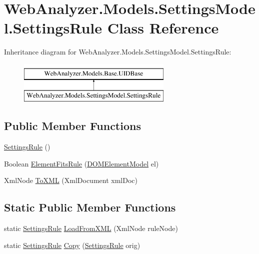 \hypertarget{class_web_analyzer_1_1_models_1_1_settings_model_1_1_settings_rule}{}\section{Web\+Analyzer.\+Models.\+Settings\+Model.\+Settings\+Rule Class Reference}
\label{class_web_analyzer_1_1_models_1_1_settings_model_1_1_settings_rule}
Inheritance diagram for Web\+Analyzer.\+Models.\+Settings\+Model.\+Settings\+Rule\+:\begin{figure}[H]
\begin{center}
\leavevmode
\includegraphics[height=2.000000cm]{class_web_analyzer_1_1_models_1_1_settings_model_1_1_settings_rule}
\end{center}
\end{figure}
\subsection*{Public Member Functions}
\begin{DoxyCompactItemize}
\item 
\hyperlink{class_web_analyzer_1_1_models_1_1_settings_model_1_1_settings_rule_ada5165c9c6b7a30cea3b3b9607fe909b}{Settings\+Rule} ()
\item 
Boolean \hyperlink{class_web_analyzer_1_1_models_1_1_settings_model_1_1_settings_rule_a3969b337984b9bed7741dd778e842d1a}{Element\+Fits\+Rule} (\hyperlink{class_web_analyzer_1_1_models_1_1_data_model_1_1_d_o_m_element_model}{D\+O\+M\+Element\+Model} el)
\item 
Xml\+Node \hyperlink{class_web_analyzer_1_1_models_1_1_settings_model_1_1_settings_rule_aaee1cf5ecd277bc0ff93b08136c971aa}{To\+X\+M\+L} (Xml\+Document xml\+Doc)
\end{DoxyCompactItemize}
\subsection*{Static Public Member Functions}
\begin{DoxyCompactItemize}
\item 
static \hyperlink{class_web_analyzer_1_1_models_1_1_settings_model_1_1_settings_rule}{Settings\+Rule} \hyperlink{class_web_analyzer_1_1_models_1_1_settings_model_1_1_settings_rule_a444331f780bd89b144249f64148dc05e}{Load\+From\+X\+M\+L} (Xml\+Node rule\+Node)
\item 
static \hyperlink{class_web_analyzer_1_1_models_1_1_settings_model_1_1_settings_rule}{Settings\+Rule} \hyperlink{class_web_analyzer_1_1_models_1_1_settings_model_1_1_settings_rule_aa59768fb94258353389ed98f702c258f}{Copy} (\hyperlink{class_web_analyzer_1_1_models_1_1_settings_model_1_1_settings_rule}{Settings\+Rule} orig)
\end{DoxyCompactItemize}

